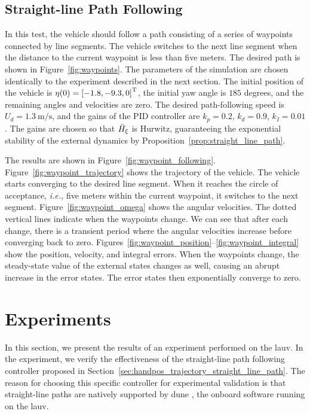 \subsection{Straight-line Path Following}
\label{sec:handpos_trajectory_simulation_waypoints}

In this test, the vehicle should follow a path consisting of a series of waypoints connected by line segments.
The vehicle switches to the next line segment when the distance to the current waypoint is less than five meters.
The desired path is shown in Figure~\ref{fig:waypoints}.
The parameters of the simulation are chosen identically to the experiment described in the next section.
The initial position of the vehicle is $\eta(0) = \left[-1.8, -9.3, 0\right]^{\mathrm{T}}$, the initial yaw angle is $185$ degrees, and the remaining angles and velocities are zero.
The desired path-following speed is $U_d = \SI{1.3}{\meter\per\second}$, and the gains of the PID controller are $k_p = 0.2$, $k_d = 0.9$, $k_I = 0.01$.
The gains are chosen so that $\Bar{H}_{\xi}$ is Hurwitz, guaranteeing the exponential stability of the external dynamics by Proposition~\ref{prop:straight_line_path}.

The results are shown in Figure~\ref{fig:waypoint_following}.
Figure~\ref{fig:waypoint_trajectory} shows the trajectory of the vehicle.
The vehicle starts converging to the desired line segment.
When it reaches the circle of acceptance, \emph{i.e.,} five meters within the current waypoint, it switches to the next segment.
Figure~\ref{fig:waypoint_omega} shows the angular velocities.
The dotted vertical lines indicate when the waypoints change.
We can see that after each change, there is a transient period where the angular velocities increase before converging back to zero.
Figures~\ref{fig:waypoint_position}--\ref{fig:waypoint_integral} show the position, velocity, and integral errors.
When the waypoints change, the steady-state value of the external states changes as well, causing an abrupt increase in the error states.
The error states then exponentially converge to zero.

\section{Experiments}
\label{sec:handpos_trajectory_experiments}

In this section, we present the results of an experiment performed on the \gls{lauv}.
In the experiment, we verify the effectiveness of the straight-line path following controller proposed in Section~\ref{sec:handpos_trajectory_straight_line_path}.
The reason for choosing this specific controller for experimental validation is that straight-line paths are natively supported by \gls{dune} \cite{dune}, the onboard software running on the \gls{lauv}.

